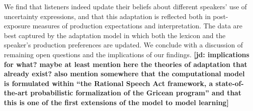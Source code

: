 \documentclass[lucida,biblatex]{sp} %
\newcommand{\jd}[1]{\textcolor{PinkyPurple}{\textbf{[jd: #1]}}}
\begin{document}
We find that listeners indeed update their beliefs about different  speakers' use of uncertainty expressions, and that this adaptation is reflected both in post-exposure measures of production expectations and interpretation. The data are best captured by the adaptation model in which both the lexicon and the speaker's production preferences are updated. We conclude with a discussion of remaining open questions and the implications of our findings. \jd{implications for what? maybe at least mention here the theories of adaptation that already exist? also mention somewhere that the computational model is formulated within ``the Rational Speech Act framework, a state-of-the-art probabilistic formalization of the Gricean program'' and that this is one of the first extensions of the model to model learning}


\end{document}
